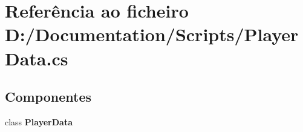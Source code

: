 \section{Referência ao ficheiro D\+:/\+Documentation/\+Scripts/\+Player\+Data.cs}
\label{_player_data_8cs}
\subsection*{Componentes}
\begin{DoxyCompactItemize}
\item 
class \textbf{ Player\+Data}
\end{DoxyCompactItemize}
